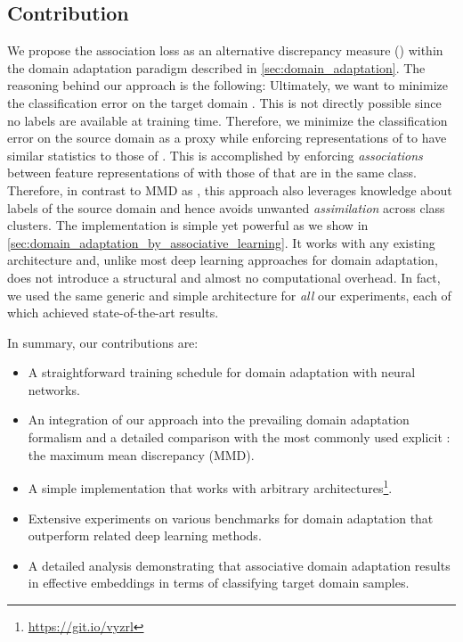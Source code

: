 \documentclass[10pt,twocolumn,letterpaper]{article}
\begin{document}
\subsection{Contribution}
We propose the association loss  as an alternative discrepancy measure () within the domain adaptation paradigm described in \autoref{sec:domain_adaptation}.
The reasoning behind our approach is the following: Ultimately, we want to minimize the classification error on the target domain . This is not directly possible since no labels are available at training time. Therefore, we minimize the classification error on the source domain  as a proxy while enforcing representations of  to have similar statistics to those of . This is accomplished by enforcing \emph{associations} \cite{Haeusser2017} between feature representations of  with those of  that are in the same class.
Therefore, in contrast to MMD as , this approach also leverages knowledge about labels of the source domain and hence avoids unwanted \emph{assimilation} across class clusters.
The implementation is simple yet powerful as we show in \autoref{sec:domain_adaptation_by_associative_learning}. It works with any existing architecture and, unlike most deep learning approaches for domain adaptation, does not introduce a structural and almost no computational overhead. 
In fact, we used the same generic and simple architecture for \emph{all} our experiments, each of which achieved state-of-the-art results.

In summary, our contributions are:
\begin{itemize}
    \item A straightforward training schedule for domain adaptation with neural networks. 
    \item An integration of our approach into the prevailing domain adaptation formalism and a detailed comparison with the most commonly used explicit : the maximum mean discrepancy (MMD).    
    \item A simple implementation that works with arbitrary architectures\footnote{\url{https://git.io/vyzrl}}.
    \item Extensive experiments on various benchmarks for domain adaptation that outperform related deep learning methods.
    \item A detailed analysis demonstrating that associative domain adaptation results in effective embeddings in terms of classifying target domain samples.
\end{itemize}
\end{document}
